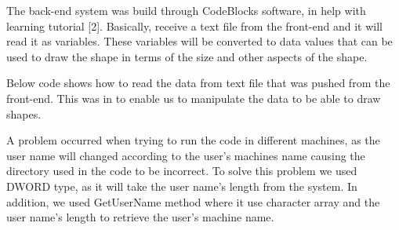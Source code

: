 \documentclass{article}
\begin{document}
The back-end system was build through CodeBlocks software, in help with learning tutorial [2]. Basically, receive a text file from the front-end and it will read it as variables. These variables will be converted to data values that can be used to draw the shape in terms of the size and other aspects of the shape.  


Below code shows how to read the data from text file that was pushed from the front-end. This was in to enable us to manipulate the data to be able to draw shapes.

A problem occurred when trying to run the code in different machines, as the user name will changed according to the user’s machines name causing the directory used in the code to be incorrect. To solve this problem we used DWORD type, as it will take the user name’s length from the system. In addition, we used GetUserName method where it use character array and the user name’s length to retrieve the user’s machine name. 
\end{document}
